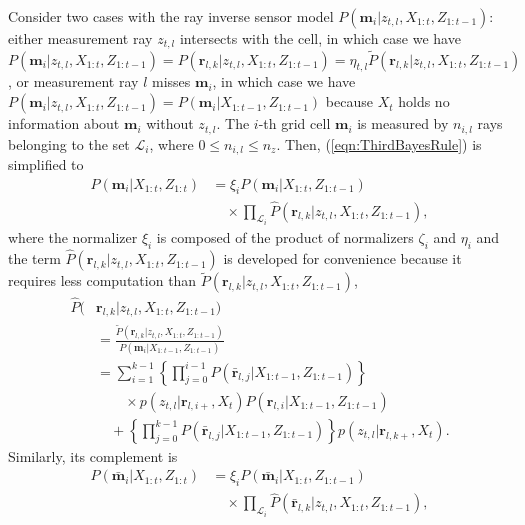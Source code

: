 \documentclass[letterpaper, 10pt, conference]{ieeeconf}
\newcommand{\refeqn}[1]{(\ref{eqn:#1})}
\begin{document}
Consider two cases with the ray inverse sensor model $P(\mathbf{m}_i|z_{t,l},X_{1:t},Z_{1:t-1})$: either measurement ray $z_{t,l}$ intersects with the cell, in which case we have $P(\mathbf{m}_i|z_{t,l},X_{1:t},Z_{1:t-1})=P(\mathbf{r}_{l,k}|z_{t,l},X_{1:t},Z_{1:t-1})=\eta_{t,l}\tilde P(\mathbf{r}_{l,k}|z_{t,l},X_{1:t},Z_{1:t-1})$, or measurement ray $l$ misses $\mathbf{m}_i$, in which case we have $P(\mathbf{m}_i|z_{t,l},X_{1:t},Z_{1:t-1})=P(\mathbf{m}_i|X_{1:t-1},Z_{1:t-1})$ because $X_t$ holds no information about $\mathbf{m}_i$ without $z_{t,l}$.
The $i$-th grid cell $\mathbf{m}_i$ is measured by $n_{i,l}$ rays belonging to the set $\mathcal L_i$, where $0\leq n_{i,l}\leq n_z$.
Then, \refeqn{ThirdBayesRule} is simplified to
\begin{align}
P(\mathbf{m}_i|X_{1:t},Z_{1:t})
&=\xi_i P(\mathbf{m}_i|X_{1:t},Z_{1:t-1})\nonumber\\&\quad\times
\prod_{\mathcal L_i}
\hat P(\mathbf{r}_{l,k}|z_{t,l},X_{1:t},Z_{1:t-1})
,
\label{eqn:ISM_Fusion}
\end{align}
where the normalizer $\xi_i$ is composed of the product of normalizers $\zeta_i$ and $\eta_i$ and the term $\hat P(\mathbf{r}_{l,k}|z_{t,l},X_{1:t},Z_{1:t-1})$ is developed for convenience because it requires less computation than $\tilde P(\mathbf{r}_{l,k}|z_{t,l},X_{1:t},Z_{1:t-1})$,
\begin{align}
\hat P(&\mathbf{r}_{l,k}|z_{t,l},X_{1:t},Z_{1:t-1})
\nonumber\\&=\frac{\tilde P(\mathbf{r}_{l,k}|z_{t,l},X_{1:t},Z_{1:t-1})}{P(\mathbf{m}_i|X_{1:t-1},Z_{1:t-1})}
\nonumber\\&=
\sum_{i=1}^{k-1}\left\{\prod_{j=0}^{i-1}P(\bar{\mathbf{r}}_{l,j}|X_{1:t-1},Z_{1:t-1})\right\}\nonumber\\&\quad\quad\times p(z_{t,l}|\mathbf{r}_{l,i+},X_t)P(\mathbf{r}_{l,i}|X_{1:t-1},Z_{1:t-1})
\nonumber\\&\quad
+
\left\{\prod_{j=0}^{k-1}P(\bar{\mathbf{r}}_{l,j}|X_{1:t-1},Z_{1:t-1})\right\}p(z_{t,l}|\mathbf{r}_{l,k+},X_t).
\end{align}
Similarly, its complement is
\begin{align}
P(\bar{\mathbf{m}}_i|X_{1:t},Z_{1:t})
&=\xi_i P(\bar{\mathbf{m}}_i|X_{1:t},Z_{1:t-1})
\nonumber\\&\quad\times\prod_{\mathcal L_i}
\hat P(\bar{\mathbf{r}}_{l,k}|z_{t,l},X_{1:t},Z_{1:t-1})
,
\label{eqn:ISM_Bar_Fusion}
\end{align}
\end{document}
